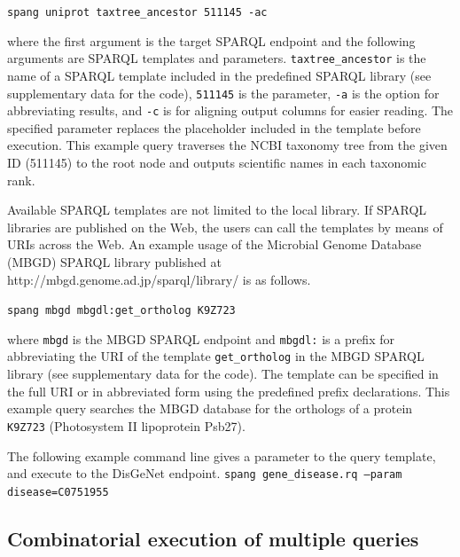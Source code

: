 \documentclass[runningheads]{llncs}
\begin{document}
\texttt{spang uniprot taxtree\_ancestor 511145 -ac}

\noindent where the first argument is the target SPARQL endpoint and the following arguments are SPARQL templates and parameters. {\tt taxtree\_ancestor} is the name of a SPARQL template included in the predefined SPARQL library (see supplementary data for the code), {\tt 511145} is the parameter, {\tt -a} is the option for abbreviating results, and {\tt -c} is for aligning output columns for easier reading.
The specified parameter replaces the placeholder included in the template before execution. 
This example query traverses the NCBI taxonomy tree from the given ID (511145) to the root node and outputs scientific names in each taxonomic rank.


Available SPARQL templates are not limited to the local library.
If SPARQL libraries are published on the Web, the users can call the templates by means of URIs across the Web.
An example usage of the Microbial Genome Database (MBGD) SPARQL library published at http://mbgd.genome.ad.jp/sparql/library/ is as follows.

\texttt{spang mbgd mbgdl:get\_ortholog K9Z723}

where {\tt mbgd} is the MBGD SPARQL endpoint \citep{Chiba} and \texttt{mbgdl:} is a prefix for abbreviating the URI of the template {\tt get\_ortholog} in the MBGD SPARQL library (see supplementary data for the code). 
The template can be specified in the full URI or in abbreviated form using the predefined prefix declarations.
This example query searches the MBGD database \citep{Uchiyama} for the orthologs of a protein \texttt{K9Z723} (Photosystem II lipoprotein Psb27).

The following example command line gives a parameter to the query template, and execute to the DisGeNet endpoint.
\texttt{spang gene\_disease.rq --param disease=C0751955}




\subsection{Combinatorial execution of multiple queries}
\end{document}
